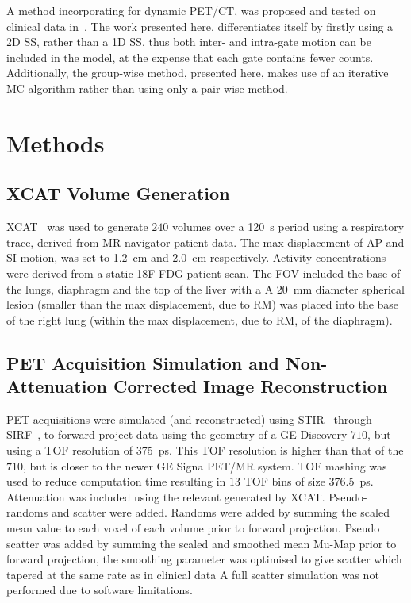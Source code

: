     A method incorporating  for dynamic \gls{PET}/\gls{CT}, was proposed and tested on clinical data in~\cite{Chan2018Non-RigidPET}. The work presented here, differentiates itself by firstly using a \gls{2D} \gls{SS}, rather than a \gls{1D} \gls{SS}, thus both inter- and intra-gate motion can be included in the model, at the expense that each gate contains fewer counts. Additionally, the group-wise method, presented here, makes use of an iterative \gls{MC} algorithm rather than using only a pair-wise method.


\section{Methods} \label{sec:methods}
    \subsection{XCAT Volume Generation} \label{sec:xcat_volume_generation}
        \gls{XCAT}~\cite{Segars2010} was used to generate $240$ volumes over a \SI{120}{\second} period using a respiratory trace, derived from \gls{MR} navigator patient data. The max displacement of \acrlong{AP} and \acrlong{SI} motion, was set to \SI{1.2}{\centi\metre} and \SI{2.0}{\centi\metre} respectively. Activity concentrations were derived from a static \gls{18F-FDG} patient scan. The \gls{FOV} included the base of the lungs, diaphragm and the top of the liver with a A \SI{20}{\milli\metre} diameter spherical lesion (smaller than the max displacement, due to \gls{RM}) was placed into the base of the right lung (within the max displacement, due to \gls{RM}, of the diaphragm).
    
    
    \subsection{PET Acquisition Simulation and Non-Attenuation Corrected Image Reconstruction} \label{sec:pet_acquisition_simulation_and_non_attenuation_corrected_image_reconstruction}
        \gls{PET} acquisitions were simulated (and reconstructed) using \gls{STIR}~\cite{Thielemans2012, Nikos2019} through \gls{SIRF}~\cite{Ovtchinnikov2017}, to forward project data using the geometry of a \gls{GE} Discovery $710$, but using a \gls{TOF} resolution of \SI{375}{\pico\second}. This \gls{TOF} resolution is higher than that of the $710$, but is closer to the newer \gls{GE} Signa \gls{PET}/\gls{MR} system. \gls{TOF} mashing was used to reduce computation time resulting in $13$ \gls{TOF} bins of size \SI{376.5}{\pico\second}. Attenuation was included using the relevant  generated by \gls{XCAT}. Pseudo-randoms and scatter were added. Randoms were added by summing the scaled mean value to each voxel of each volume prior to forward projection. Pseudo scatter was added by summing the scaled and smoothed mean \gls{Mu-Map} prior to forward projection, the smoothing parameter was optimised to give scatter which tapered at the same rate as in clinical data A full scatter simulation was not performed due to software limitations.
        
